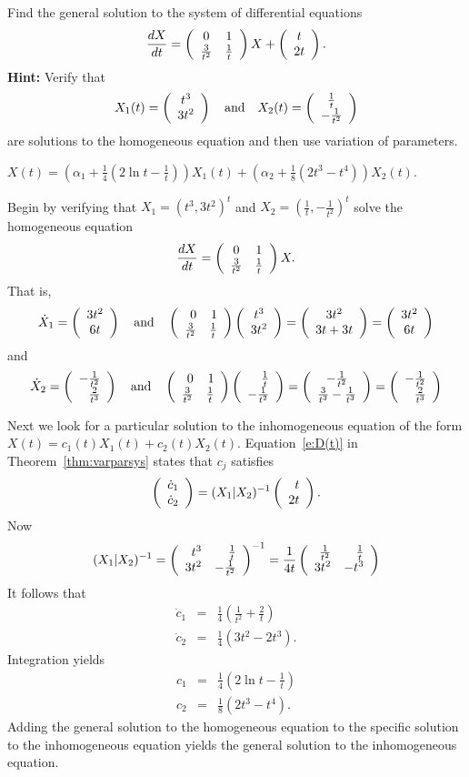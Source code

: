 \documentclass{ximera}
\begin{document}
\begin{exercise}  \label{c17.3.4}
Find the general solution to the system of differential equations
\[
\frac{dX}{dt}= \left(\begin{array}{cc} 0 & 1\\ \frac{3}{t^2} &\frac{1}{t}\end{array}\right)X+\left(\begin{array}{c} t \\ 2t\end{array}\right).
\]
{\bf Hint:} Verify that 
\[
X_1(t) = \left(\begin{array}{c} t^3 \\ 3t^2\end{array}\right)\quad\mbox{and}\quad X_2(t) = \left(\begin{array}{c} \frac{1}{t} \\ -\frac{1}{t^2}\end{array}\right)
\]
are solutions to the homogeneous equation and then use variation of parameters.

\begin{solution}

\ans $X(t) = \left(\alpha_1+\frac{1}{4}\left(2\ln t -
\frac{1}{t}\right)\right)X_1(t) + \left(\alpha_2 + \frac{1}{8}
\left(2t^3-t^4\right)\right)X_2(t)$.

\soln  Begin by verifying that $X_1=(t^3,3t^2)^t$ and 
$X_2=(\frac{1}{t},-\frac{1}{t^2})^t$ solve the homogeneous
equation
\[
\frac{dX}{dt}= \left(\begin{array}{cc} 0 & 1\\ \frac{3}{t^2} &\frac{1}{t}\end{array}\right)X.
\]
That is,
\[
\dot{X}_1 = \left(\begin{array}{c} 3t^2 \\ 6t\end{array}\right) \quad\mbox{and}\quad 
\left(\begin{array}{rr} 0 & 1\\ \frac{3}{t^2} &\frac{1}{t}\end{array}\right)\left(\begin{array}{c} t^3 \\ 3t^2\end{array}\right) = 
\left(\begin{array}{c} 3t^2 \\ 3t+3t\end{array}\right) = \left(\begin{array}{c} 3t^2 \\ 6t\end{array}\right)
\]
and 
\[
\dot{X}_2 = \left(\begin{array}{r} -\frac{1}{t^2} \\ \frac{2}{t^3}\end{array}\right) \quad\mbox{and}\quad 
\left(\begin{array}{rr} 0 & 1\\ \frac{3}{t^2} &\frac{1}{t}\end{array}\right)
\left(\begin{array}{r} \frac{1}{t} \\ -\frac{1}{t^2}\end{array}\right) = 
\left(\begin{array}{c} -\frac{1}{t^2} \\ \frac{3}{t^3}-\frac{1}{t^3}\end{array}\right) 
= \left(\begin{array}{r} -\frac{1}{t^2} \\ \frac{2}{t^3}\end{array}\right)
\]

Next we look for a particular solution to the inhomogeneous equation of 
the form $X(t)=c_1(t)X_1(t)+c_2(t)X_2(t)$.  Equation~\eqref{e:D(t)} in
Theorem~\ref{thm:varparsys} states that $c_j$ satisfies
\[
\left(\begin{array}{r} \dot{c}_1 \\ \dot{c}_2\end{array}\right) = (X_1|X_2)^{-1} \left(\begin{array}{r} t \\ 2t\end{array}\right).
\]
Now 
\[
 (X_1|X_2)^{-1} = \left(\begin{array}{rr} t^3 & \frac{1}{t}\\ 3t^2 &-\frac{1}{t^2}\end{array}\right)^{-1} = 
\frac{1}{4t}\left(\begin{array}{rr} \frac{1}{t^2} & \frac{1}{t}\\ 3t^2 &-t^3\end{array}\right)
\]
It follows that 
\begin{eqnarray*}
\dot{c}_1 & = & \frac{1}{4}\left(\frac{1}{t^2}+\frac{2}{t}\right) \\
\dot{c}_2 & = & \frac{1}{4}\left(3t^2-2t^3\right).
\end{eqnarray*}
Integration yields
\begin{eqnarray*} 
c_1 & = & \frac{1}{4}\left(2\ln t - \frac{1}{t}\right)\\
c_2 & = & \frac{1}{8}\left(2t^3-t^4\right).
\end{eqnarray*}
Adding the general solution to the homogeneous equation to the specific
solution to the inhomogeneous equation yields the general solution to the
inhomogeneous equation.



\end{solution}
\end{exercise}
\end{document}
